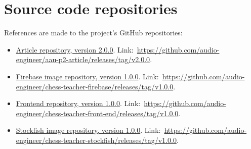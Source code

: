 \chapter{Source code repositories}\label{ch:source-code-repositories}

References are made to the project's GitHub repositories:

\begin{itemize}
    \item \href{https://github.com/audio-engineer/aau-p2-article/releases/tag/v2.0.0}
    {Article repository, version 2.0.0}.
    Link:~\url{https://github.com/audio-engineer/aau-p2-article/releases/tag/v2.0.0}.
    \item \href{https://github.com/audio-engineer/chess-teacher-firebase/releases/tag/v1.0.0}
    {Firebase image repository, version 1.0.0}.
    Link:~\url{https://github.com/audio-engineer/chess-teacher-firebase/releases/tag/v1.0.0}.
    \item \href{https://github.com/audio-engineer/chess-teacher-front-end/releases/tag/v1.0.0}
    {Frontend repository, version 1.0.0}.
    Link:~\url{https://github.com/audio-engineer/chess-teacher-front-end/releases/tag/v1.0.0}.
    \item \href{https://github.com/audio-engineer/chess-teacher-stockfish/releases/tag/v1.0.0}
    {Stockfish image repository, version 1.0.0}.
    Link:~\url{https://github.com/audio-engineer/chess-teacher-stockfish/releases/tag/v1.0.0}.
\end{itemize}
